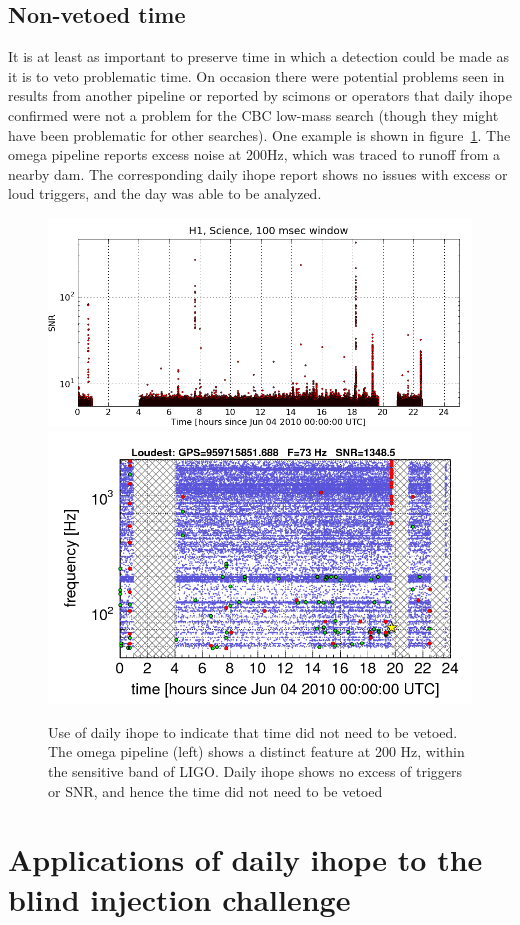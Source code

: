 \subsection{Non-vetoed time}

It is at least as important to preserve time in which a detection
could be made as it is to veto problematic time.  On occasion there
were potential problems seen in results from another pipeline or
reported by scimons or operators that daily ihope confirmed were not a
problem for the CBC low-mass search (though they might have been
problematic for other searches).  One example is shown in
figure~\ref{f:non_vetoed_time}.  The omega pipeline reports excess
noise at 200Hz, which was traced to runoff from a nearby dam.  The
corresponding daily ihope report shows no issues with excess or loud
triggers, and the day was able to be analyzed.

\begin{figure}
  \includegraphics[width=0.5\linewidth]{figures/detchar/20100604_H1_0_100MILLISEC_CLUSTERED_snr_vs_time}
  \includegraphics[width=0.5\linewidth]{figures/detchar/S6-H1-omega-959644815-959731215-GlitchTS}
  \caption[Use of daily ihope to indicate no veto needed] {
  \label{f:non_vetoed_time}
Use of daily ihope to indicate that time did not need to be vetoed.
The omega pipeline (left) shows a distinct feature at 200 Hz, within
the sensitive band of LIGO.  Daily ihope shows no excess of triggers
or SNR, and hence the time did not need to be vetoed}
\end{figure}%


\section{Applications of daily ihope to the blind injection challenge}
\label{sec:applications_applications_dog}

